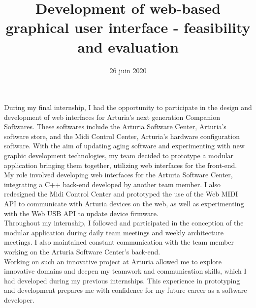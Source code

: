 \documentclass[francais]{rapportPFE}  %
\title{Development of web-based graphical user interface - feasibility and evaluation}
\date{26 juin 2020}
\begin{document}
\maketitle



\begin{ResumeMotsCles}

\begin{resumeEn}
During my final internship, I had the opportunity to participate in the design and development of web interfaces for Arturia's next generation Companion Softwares. These softwares include the Arturia Software Center, Arturia's software store, and the Midi Control Center, Arturia's hardware configuration software. With the aim of updating aging software and experimenting with new graphic development technologies, my team decided to prototype a modular application bringing them together, utilizing web interfaces for the front-end.\\
My role involved developing web interfaces for the Arturia Software Center, integrating a C++ back-end developed by another team member. I also redesigned the Midi Control Center and prototyped the use of the Web MIDI API to communicate with Arturia devices on the web, as well as experimenting with the Web USB API to update device firmware.\\
Throughout my internship, I followed and participated in the conception of the modular application during daily team meetings and weekly architecture meetings. I also maintained constant communication with the team member working on the Arturia Software Center's back-end.\\
Working on such an innovative project at Arturia allowed me to explore innovative domains and deepen my teamwork and communication skills, which I had developed during my previous internships. This experience in prototyping and development prepares me with confidence for my future career as a software developer.
\end{resumeEn}




\end{ResumeMotsCles}
\end{document}
